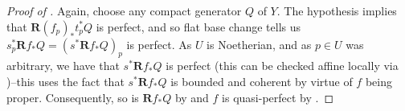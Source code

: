 \documentclass[11pt]{amsart}
\theoremstyle{plain}
\theoremstyle{definition}
\numberwithin{equation}{section}
\numberwithin{theorem}{section}
\begin{document}
\begin{proof}[Proof of ]
    Again, choose any compact generator $Q$ of $Y$.
    The hypothesis implies that $\mathbf{R}(f_p)_\ast t^\ast_p Q$ is perfect, and so flat base change tells us $s_p^\ast \mathbf{R}f_\ast Q=(s^\ast \mathbf{R}f_\ast Q)_p$ is perfect.
    As $U$ is Noetherian, and as $p\in U$ was arbitrary, we have that $s^\ast\mathbf{R}f_\ast Q$ is perfect (this can be checked affine locally via \cite[Theorem 4.1]{Avramov/Iyengar/Lipman:2010})--this uses the fact that $s^\ast\mathbf{R}f_\ast Q$ is bounded and coherent by virtue of $f$ being proper.
    Consequently, so is $\mathbf{R}f_\ast Q$ by  and $f$ is quasi-perfect by .

\end{proof}
\end{document}
